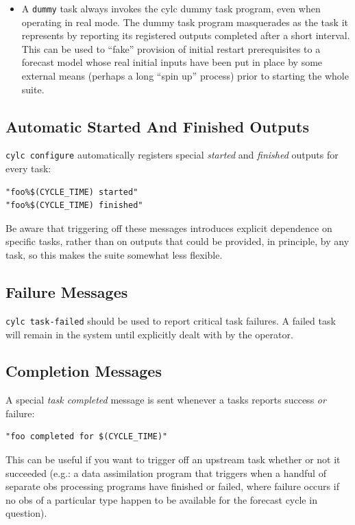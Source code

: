 \documentclass[11pt,a4paper]{article}
\begin{document}
\begin{itemize}
    \item A \lstinline=dummy= task always invokes the cylc dummy task
        program, even when operating in real mode.  The dummy task
        program masquerades as the task it represents by reporting its
        registered outputs completed after a short interval. This can be
        used to ``fake'' provision of initial restart prerequisites to a
        forecast model whose real initial inputs have been put in place
        by some external means (perhaps a long ``spin up'' process)
        prior to starting the whole suite.

\end{itemize}



\subsection{Automatic Started And Finished Outputs}

\lstinline=cylc configure= automatically registers special {\em started}
and {\em finished} outputs for every task: 

\begin{lstlisting}
"foo%$(CYCLE_TIME) started"
"foo%$(CYCLE_TIME) finished"
\end{lstlisting}

Be aware that triggering off these messages introduces explicit
dependence on specific tasks, rather than on outputs that could be
provided, in principle, by any task, so this makes the suite somewhat
less flexible.


\subsection{Failure Messages}

\lstinline=cylc task-failed= should be used to report critical task
failures. A failed task will remain in the system until explicitly dealt
with by the operator.

\subsection{Completion Messages}

A special {\em task completed} message is sent whenever a tasks reports
success {\em or} failure:
\begin{lstlisting}
"foo completed for $(CYCLE_TIME)"
\end{lstlisting}
 
This can be useful if you want to trigger off an upstream task whether
or not it succeeded (e.g.: a data assimilation program that triggers
when a handful of separate obs processing programs have finished or
failed, where failure occurs if no obs of a particular type happen to be
available for the forecast cycle in question).
\end{document}
